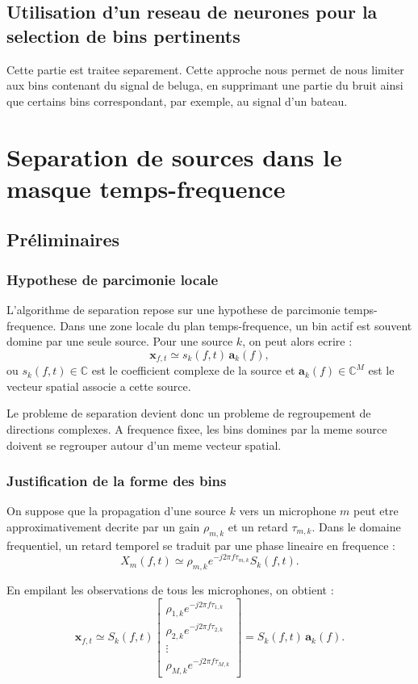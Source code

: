 \documentclass[11pt,a4paper]{article}
\begin{document}
\subsection{Utilisation d'un reseau de neurones pour la selection de bins pertinents}
Cette partie est traitee separement.
Cette approche nous permet de nous limiter aux bins contenant du signal de
beluga, en supprimant une partie du bruit ainsi que certains bins correspondant,
par exemple, au signal d'un bateau.
 
\section{Separation de sources dans le masque temps-frequence}

\subsection{Préliminaires}
\subsubsection{Hypothese de parcimonie locale}

L'algorithme de separation repose sur une hypothese de parcimonie
temps-frequence. Dans une zone locale du plan temps-frequence, un bin actif est
souvent domine par une seule source. Pour une source $k$, on peut alors ecrire :
\[
  \mathbf{x}_{f,t}
    \simeq
    s_k(f,t)\,\mathbf{a}_k(f),
\]
ou $s_k(f,t) \in \mathbb{C}$ est le coefficient complexe de la source et
$\mathbf{a}_k(f) \in \mathbb{C}^M $ est le vecteur spatial associe a cette source.

Le probleme de separation devient donc un probleme de regroupement de
directions complexes. A frequence fixee, les bins domines par la meme source
doivent se regrouper autour d'un meme vecteur spatial.

\subsubsection{Justification de la forme des bins}

On suppose que la propagation d'une source $k$ vers un microphone $m$ peut etre
approximativement decrite par un gain $\rho_{m,k}$ et un retard
$\tau_{m,k}$. Dans le domaine frequentiel, un retard temporel se traduit par
une phase lineaire en frequence :
\[
  X_m(f,t)
    \simeq
    \rho_{m,k}
    e^{-j2\pi f\tau_{m,k}}
    S_k(f,t).
\]

En empilant les observations de tous les microphones, on obtient :
\[
  \mathbf{x}_{f,t}
    \simeq
    S_k(f,t)
    \begin{bmatrix}
      \rho_{1,k} e^{-j2\pi f\tau_{1,k}} \\
      \rho_{2,k} e^{-j2\pi f\tau_{2,k}} \\
      \vdots \\
      \rho_{M,k} e^{-j2\pi f\tau_{M,k}}
    \end{bmatrix}
    =
    S_k(f,t)\,\mathbf{a}_k(f).
\]
\end{document}
